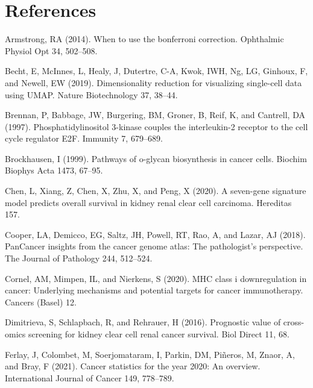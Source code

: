 \documentclass[
  parskip,
  oneside]{\documentclass[oneside]{book}}
\newlength{\cslhangindent}
\newlength{\cslentryspacingunit} %
\newenvironment{CSLReferences}[2] %
 {%
  \setlength{\parindent}{0pt}
  \ifodd #1
  \let\oldpar\par
  \def\par{\hangindent=\cslhangindent\oldpar}
  \fi
  \setlength{\parskip}{#2\cslentryspacingunit}
 }%
 {}
\begin{document}
\hypertarget{references}{%
\section{References}\label{references}}

\hypertarget{refs}{}
\begin{CSLReferences}{0}{0}
\leavevmode{}%
Armstrong, RA (2014). When to use the bonferroni correction. Ophthalmic
Physiol Opt 34, 502--508.

\leavevmode{}%
Becht, E, McInnes, L, Healy, J, Dutertre, C-A, Kwok, IWH, Ng, LG,
Ginhoux, F, and Newell, EW (2019). Dimensionality reduction for
visualizing single-cell data using UMAP. Nature Biotechnology 37,
38--44.

\leavevmode{}%
Brennan, P, Babbage, JW, Burgering, BM, Groner, B, Reif, K, and
Cantrell, DA (1997). Phosphatidylinositol 3-kinase couples the
interleukin-2 receptor to the cell cycle regulator E2F. Immunity 7,
679--689.

\leavevmode{}%
Brockhausen, I (1999). Pathways of o-glycan biosynthesis in cancer
cells. Biochim Biophys Acta 1473, 67--95.

\leavevmode{}%
Chen, L, Xiang, Z, Chen, X, Zhu, X, and Peng, X (2020). A seven-gene
signature model predicts overall survival in kidney renal clear cell
carcinoma. Hereditas 157.

\leavevmode{}%
Cooper, LA, Demicco, EG, Saltz, JH, Powell, RT, Rao, A, and Lazar, AJ
(2018). PanCancer insights from the cancer genome atlas: The
pathologist's perspective. The Journal of Pathology 244, 512--524.

\leavevmode{}%
Cornel, AM, Mimpen, IL, and Nierkens, S (2020). MHC class i
downregulation in cancer: Underlying mechanisms and potential targets
for cancer immunotherapy. Cancers (Basel) 12.

\leavevmode{}%
Dimitrieva, S, Schlapbach, R, and Rehrauer, H (2016). Prognostic value
of cross-omics screening for kidney clear cell renal cancer survival.
Biol Direct 11, 68.

\leavevmode{}%
Ferlay, J, Colombet, M, Soerjomataram, I, Parkin, DM, Piñeros, M, Znaor,
A, and Bray, F (2021). Cancer statistics for the year 2020: An overview.
International Journal of Cancer 149, 778--789.


\end{CSLReferences}
\end{document}
